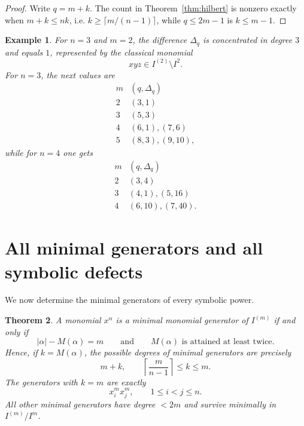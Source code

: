 \documentclass[11pt]{article}
\newtheorem{theorem}{Theorem}[section]
\newtheorem{example}[theorem]{Example}
\begin{document}
\begin{proof}
Write \(q=m+k\).  The count in Theorem~\ref{thm:hilbert} is nonzero
exactly when \(m+k\le nk\), i.e.
\(k\ge\lceil m/(n-1)\rceil\), while \(q\le2m-1\) is \(k\le m-1\).

\end{proof}

\begin{example}
For \(n=3\) and \(m=2\), the difference \(\Delta_q\) is concentrated in degree
\(3\) and equals \(1\), represented by the classical monomial
\[
 xyz\in I^{(2)}\setminus I^2.
\]
For \(n=3\), the next values are
\[
\begin{array}{c|c}
m& (q,\Delta_q)\\ \hline
2&(3,1)\\
3&(5,3)\\
4&(6,1),(7,6)\\
5&(8,3),(9,10),
\end{array}
\]
while for \(n=4\) one gets
\[
\begin{array}{c|c}
m& (q,\Delta_q)\\ \hline
2&(3,4)\\
3&(4,1),(5,16)\\
4&(6,10),(7,40).
\end{array}
\]
\end{example}

\section{All minimal generators and all symbolic defects}

We now determine the minimal generators of every symbolic power.

\begin{theorem}\label{thm:minimal-generators}
A monomial \(x^\alpha\) is a minimal monomial generator of
\(I^{(m)}\) if and only if
\begin{equation}\label{eq:min-gen-characterization}
 |\alpha|-M(\alpha)=m
 \qquad\text{and}\qquad
 M(\alpha)\text{ is attained at least twice}.
\end{equation}
Hence, if \(k=M(\alpha)\), the possible degrees of minimal generators
are precisely
\[
 m+k,
 \qquad
 \left\lceil\frac{m}{n-1}\right\rceil\le k\le m.
\]
The generators with \(k=m\) are exactly
\[
 x_i^m x_j^m,\qquad 1\le i<j\le n.
\]
All other minimal generators have degree \(<2m\) and survive minimally
in \(I^{(m)}/I^m\).
\end{theorem}
\end{document}
